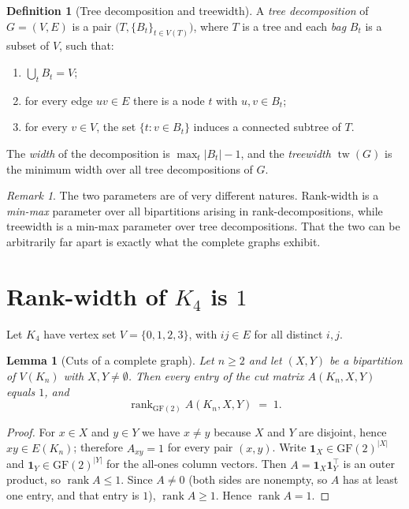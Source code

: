 \documentclass[11pt]{article}
\newtheorem{lemma}[theorem]{Lemma}
\theoremstyle{definition}
\newtheorem{definition}[theorem]{Definition}
\theoremstyle{remark}
\newtheorem{remark}[theorem]{Remark}
\newcommand{\tw}{\operatorname{tw}}
\DeclareMathOperator{\rank}{rank}
\begin{document}
\begin{definition}[Tree decomposition and treewidth]\label{def:tw}
A \emph{tree decomposition} of $G=(V,E)$ is a pair $\bigl(T, \{B_t\}_{t \in
V(T)}\bigr)$, where $T$ is a tree and each \emph{bag} $B_t$ is a subset of $V$,
such that:
\begin{enumerate}
\item[(i)] $\bigcup_{t} B_t = V$;
\item[(ii)] for every edge $uv \in E$ there is a node $t$ with
$u, v \in B_t$;
\item[(iii)] for every $v \in V$, the set $\{t : v \in B_t\}$ induces a
connected subtree of $T$.
\end{enumerate}
The \emph{width} of the decomposition is $\max_t |B_t| - 1$, and the
\emph{treewidth} $\tw(G)$ is the minimum width over all tree decompositions
of $G$.
\end{definition}

\begin{remark}
The two parameters are of very different natures. Rank-width is a
\emph{min-max} parameter over all bipartitions arising in rank-decompositions,
while treewidth is a min-max parameter over tree decompositions. That the two
can be arbitrarily far apart is exactly what the complete graphs exhibit.
\end{remark}

\section{Rank-width of $K_4$ is $1$}

Let $K_4$ have vertex set $V = \{0,1,2,3\}$, with $ij \in E$ for all distinct
$i,j$.

\begin{lemma}[Cuts of a complete graph]\label{lem:cut-kn}
Let $n \ge 2$ and let $(X,Y)$ be a bipartition of $V(K_n)$ with $X, Y \ne
\emptyset$. Then every entry of the cut matrix $A(K_n, X, Y)$ equals $1$, and
\[
\rank_{\mathrm{GF}(2)} A(K_n, X, Y) \;=\; 1 .
\]
\end{lemma}

\begin{proof}
For $x \in X$ and $y \in Y$ we have $x \ne y$ because $X$ and $Y$ are
disjoint, hence $xy \in E(K_n)$; therefore $A_{xy} = 1$ for every pair
$(x,y)$. Write $\mathbf{1}_X \in \mathrm{GF}(2)^{|X|}$ and $\mathbf{1}_Y \in
\mathrm{GF}(2)^{|Y|}$ for the all-ones column vectors. Then $A =
\mathbf{1}_X \mathbf{1}_Y^{\!\top}$ is an outer product, so
$\rank A \le 1$. Since $A \ne 0$ (both sides are nonempty, so $A$ has at least
one entry, and that entry is $1$), $\rank A \ge 1$. Hence $\rank A = 1$.
\end{proof}
\end{document}

